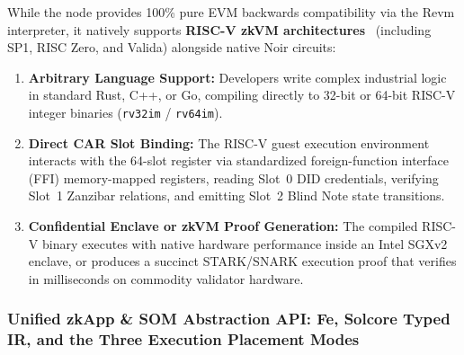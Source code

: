 \documentclass[a4paper,11pt,twoside,parskip=half-,headings=small]{scrartcl}
\newcommand{\code}[1]{\texttt{#1}}
\begin{document}
While the node provides 100\% pure EVM backwards compatibility via the Revm interpreter, it natively supports
\textbf{RISC-V zkVM architectures}~\cite{riscv2019} (including SP1, RISC Zero, and Valida) alongside native Noir circuits:
\begin{enumerate}
  \item \textbf{Arbitrary Language Support:} Developers write complex industrial logic in standard Rust, C++, or Go, compiling directly to 32-bit or 64-bit RISC-V integer binaries (\code{rv32im} / \code{rv64im}).
  \item \textbf{Direct CAR Slot Binding:} The RISC-V guest execution environment interacts with the 64-slot register via standardized foreign-function interface (FFI) memory-mapped registers, reading Slot~0 DID credentials, verifying Slot~1 Zanzibar relations, and emitting Slot~2 Blind Note state transitions.
  \item \textbf{Confidential Enclave or zkVM Proof Generation:} The compiled RISC-V binary executes with native hardware performance inside an Intel SGXv2 enclave, or produces a succinct STARK/SNARK execution proof that verifies in milliseconds on commodity validator hardware.
\end{enumerate}

\subsubsection{Unified zkApp \& SOM Abstraction API: Fe, Solcore Typed IR, and the Three Execution Placement Modes}
\label{sec:unified_zkapp_api}
\end{document}
